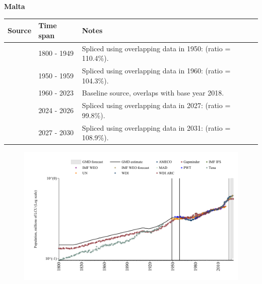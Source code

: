 \documentclass[12pt,a4paper,landscape]{article}
\begin{document}
\begin{adjustbox}{max totalsize={\paperwidth}{\paperheight},center}
\begin{minipage}[t][\textheight][t]{\textwidth}
\vspace*{0.5cm}
{}
\begin{center}
{\Large\bfseries Malta}
\end{center}
\vspace{0.5cm}
\begin{table}[H]
\centering
\small
\begin{tabular}{|l|l|l|}
\hline
\textbf{Source} & \textbf{Time span} & \textbf{Notes} \\
\hline
\rowcolor{white}\cite{Gapminder}& 1800 - 1949 &Spliced using overlapping data in 1950: (ratio = 110.4\%).\\
\rowcolor{lightgray}\cite{IMF_IFS}& 1950 - 1959 &Spliced using overlapping data in 1960: (ratio = 104.3\%).\\
\rowcolor{white}\cite{WDI}& 1960 - 2023 &Baseline source, overlaps with base year 2018.\\
\rowcolor{lightgray}\cite{AMECO}& 2024 - 2026 &Spliced using overlapping data in 2027: (ratio = 99.8\%).\\
\rowcolor{white}\cite{Gapminder}& 2027 - 2030 &Spliced using overlapping data in 2031: (ratio = 108.9\%).\\
\hline
\end{tabular}
\end{table}
\begin{figure}[H]
\centering
\includegraphics[width=\textwidth,height=0.6\textheight,keepaspectratio]{graphs/MLT_pop.pdf}
\end{figure}
\end{minipage}
\end{adjustbox}
\end{document}
